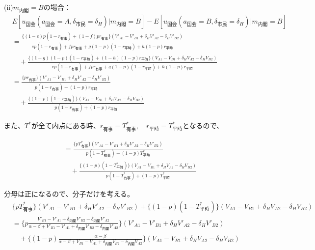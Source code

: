 \documentclass[main.tex]{subfiles}
\begin{document}
\bigskip
(ii)$m_{内閣}=B$の場合：
\begin{align*}
    & E[u_{国会}(a_{国会}=A, \delta_{市民}=\delta_H) | m_{内閣} = B  ] - E[u_{国会}(a_{国会}=B, \delta_{市民}=\delta_H) | m_{内閣} = B  ]\\[1em]
    &= \frac{ \{(1-e)p(1-r_{有事}) +  (1-f)pr_{有事}\}(V'_{A1} -V'_{B1} + \delta_H V'_{A2} - \delta_H V'_{B2})  }{ ep(1-r_{有事}) + fpr_{有事} + g(1-p)(1-r_{平時}) + h(1-p)r_{平時} }\\[1em]
    &\quad + \frac{ \{(1-g)(1-p)(1-r_{平時}) + (1-h)(1-p)r_{平時}\}(V_{A1} - V_{B1} + \delta_H V_{A2} - \delta_H V_{B2} ) }{ ep(1-r_{有事}) + fpr_{有事} + g(1-p)(1-r_{平時}) + h(1-p)r_{平時} }\\[1em]
    &= \frac{ \{ pr_{有事}\}(V'_{A1} -V'_{B1} + \delta_H V'_{A2} - \delta_H V'_{B2})  }{ p(1-r_{有事})  + (1-p)r_{平時} }\\[1em]
    &\quad + \frac{ \{(1-p)(1-r_{平時}) \}(V_{A1} - V_{B1} + \delta_H V_{A2} - \delta_H V_{B2} ) }{ p(1-r_{有事}) + (1-p)r_{平時} }
\end{align*}



また、$T^*$が全て内点にある時、$r_{有事}=T^*_{有事}, \quad r_{平時} = T^*_{平時}$となるので、

\begin{align*}
    &= \frac{ \{ pT^*_{有事}\}(V'_{A1} -V'_{B1} + \delta_H V'_{A2} - \delta_H V'_{B2})  }{ p(1-T^*_{有事})  + (1-p)T^*_{平時} }\\[1em]
    &\quad + \frac{ \{(1-p)(1-T^*_{平時}) \}(V_{A1} - V_{B1} + \delta_H V_{A2} - \delta_H V_{B2} ) }{ p(1-T^*_{有事}) + (1-p)T^*_{平時} }
\end{align*}

分母は正になるので、分子だけを考える。
\begin{align*}
    &\{ pT^*_{有事}\}(V'_{A1} -V'_{B1} + \delta_H V'_{A2} - \delta_H V'_{B2})    +   \{(1-p)(1-T^*_{平時}) \}(V_{A1} - V_{B1} + \delta_H V_{A2} - \delta_H V_{B2} ) \\[1em]
    &= \{ p \frac{ V'_{B1} - V'_{A1} +\delta_{内閣}V'_{B2} - \delta_{内閣}V'_{A2} }{ \alpha-\beta + V'_{B1}-V'_{A1} + \delta_{内閣}V'_{B2} - \delta_{内閣}V'_{A2} } \}(V'_{A1} -V'_{B1} + \delta_H V'_{A2} - \delta_H V'_{B2})\\[1em]
    &\quad + \{(1-p) \frac{ \alpha-\beta }{ \alpha-\beta + V_{B1}-V_{A1} + \delta_{内閣}V_{B2} - \delta_{内閣}V_{A2} } \}(V_{A1} - V_{B1} + \delta_H V_{A2} - \delta_H V_{B2} )
\end{align*}
\end{document}

